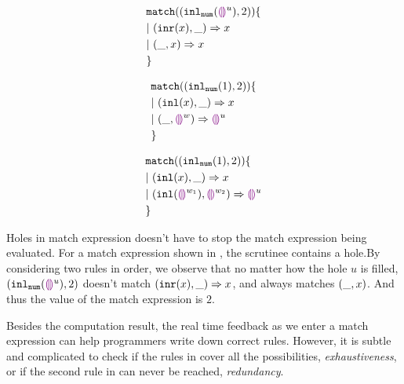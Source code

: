 \documentclass[acmsmall,screen,review,nonacm]{acmart}
\theoremstyle{slplain}
\numberwithin{thm}{section}
\begin{document}
\begin{figure}[h]
\begin{minipage}{0.33\textwidth}
\begin{equation}
\begin{split}
  &\mathtt{match} ((\mathtt{inl}_{\mathtt{num}}({\textcolor{violet}{\llparenthesis}\textcolor{violet}{\rrparenthesis}^{u}}) , 2)) \{\\
  &|~ (\mathtt{inr}(x) , \_) \Rightarrow x \\
  &|~ (\_ , x) \Rightarrow x \\
  &\}
\end{split}
\label{eq:complete}
\end{equation}
\end{minipage}%
\begin{minipage}{0.33\textwidth}
\begin{equation}
\begin{split}
  &\mathtt{match} ((\mathtt{inl}_{\mathtt{num}}({1}) , 2)) \{\\
  &|~ (\mathtt{inl}(x) , \_) \Rightarrow x \\
  &|~ (\_ , \textcolor{violet}{\llparenthesis}\textcolor{violet}{\rrparenthesis}^{w}) \Rightarrow \textcolor{violet}{\llparenthesis}\textcolor{violet}{\rrparenthesis}^{u} \\
  &\}
\end{split}
\label{eq:pathole-exhaustive}
\end{equation}
\end{minipage}%
\begin{minipage}{0.33\textwidth}
\begin{equation}
\begin{split}
  &\mathtt{match} ((\mathtt{inl}_{\mathtt{num}}({1}) , 2)) \{\\
  &|~ (\mathtt{inl}(x) , \_) \Rightarrow x \\
  &|~ (\mathtt{inl}(\textcolor{violet}{\llparenthesis}\textcolor{violet}{\rrparenthesis}^{w_1}) , \textcolor{violet}{\llparenthesis}\textcolor{violet}{\rrparenthesis}^{w_2}) \Rightarrow \textcolor{violet}{\llparenthesis}\textcolor{violet}{\rrparenthesis}^{u} \\
  &\}
\end{split}
\label{eq:pathole-redundant}
\end{equation}
\end{minipage}%
\end{figure}

Holes in match expression doesn't have to stop the match expression being evaluated.
For a match expression shown in , the scrutinee contains a hole.By considering two rules in order, we observe that
no matter how the hole $u$ is filled, $(\mathtt{inl}_{\mathtt{num}}({\textcolor{violet}{\llparenthesis}\textcolor{violet}{\rrparenthesis}^{u}}) , 2)$ doesn't match $(\mathtt{inr}(x) , \_) \Rightarrow x$,
and always matches $(\_ , x)$. And thus the value of the match expression is $2$.

Besides the computation result, the real time feedback as we enter a match expression can help programmers write down correct rules.
However, it is subtle and complicated to check if the rules in  cover all the possibilities, \ie \emph{exhaustiveness}, or if the second rule in  can never be reached, \ie \emph{redundancy}. 
\end{document}
